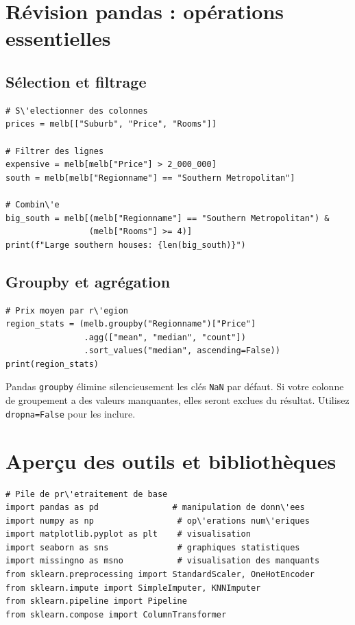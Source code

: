 \section{R\'evision pandas : op\'erations essentielles}

\subsection{S\'election et filtrage}

\begin{verbatim}
# S\'electionner des colonnes
prices = melb[["Suburb", "Price", "Rooms"]]

# Filtrer des lignes
expensive = melb[melb["Price"] > 2_000_000]
south = melb[melb["Regionname"] == "Southern Metropolitan"]

# Combin\'e
big_south = melb[(melb["Regionname"] == "Southern Metropolitan") &
                 (melb["Rooms"] >= 4)]
print(f"Large southern houses: {len(big_south)}")
\end{verbatim}

\subsection{Groupby et agr\'egation}

\begin{verbatim}
# Prix moyen par r\'egion
region_stats = (melb.groupby("Regionname")["Price"]
                .agg(["mean", "median", "count"])
                .sort_values("median", ascending=False))
print(region_stats)
\end{verbatim}

\begin{warningbox}
Pandas \texttt{groupby} \'elimine silencieusement les cl\'es \texttt{NaN} par d\'efaut. Si votre colonne de groupement a des valeurs manquantes, elles seront exclues du r\'esultat. Utilisez \texttt{dropna=False} pour les inclure.
\end{warningbox}

\section{Aper\c{c}u des outils et biblioth\`eques}

\begin{verbatim}
# Pile de pr\'etraitement de base
import pandas as pd               # manipulation de donn\'ees
import numpy as np                 # op\'erations num\'eriques
import matplotlib.pyplot as plt    # visualisation
import seaborn as sns              # graphiques statistiques
import missingno as msno           # visualisation des manquants
from sklearn.preprocessing import StandardScaler, OneHotEncoder
from sklearn.impute import SimpleImputer, KNNImputer
from sklearn.pipeline import Pipeline
from sklearn.compose import ColumnTransformer
\end{verbatim}

